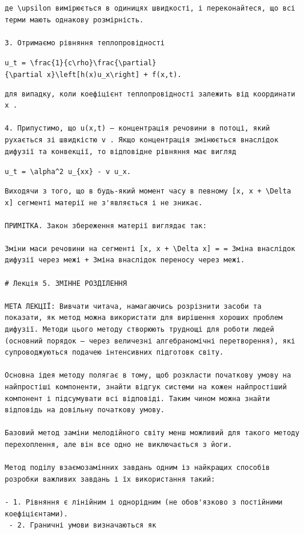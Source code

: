 \documentclass[
  ukrainian,
]{article}
\begin{document}
\begin{verbatim}
де \upsilon вимірюється в одиницях швидкості, і переконайтеся, що всі терми мають однакову розмірність.

3. Отримаємо рівняння теплопровідності
\end{verbatim}

\texttt{u\_t\ =\ \textbackslash{}frac\{1\}\{c\textbackslash{}rho\}\textbackslash{}frac\{\textbackslash{}partial\}\{\textbackslash{}partial\ x\}\textbackslash{}left{[}h(x)u\_x\textbackslash{}right{]}\ +\ f(x,t).}

\begin{verbatim}
для випадку, коли коефіцієнт теплопровідності залежить від координати x .

4. Припустимо, що u(x,t) — концентрація речовини в потоці, який рухається зі швидкістю v . Якщо концентрація змінюється внаслідок дифузії та конвекції, то відповідне рівняння має вигляд
\end{verbatim}

\texttt{u\_t\ =\ \textbackslash{}alpha\^{}2\ u\_\{xx\}\ -\ v\ u\_x.}

\begin{verbatim}
Виходячи з того, що в будь-який момент часу в певному [x, x + \Delta x] сегменті матерії не з'являється і не зникає.

ПРИМІТКА. Закон збереження матерії виглядає так:

Зміни маси речовини на сегменті [x, x + \Delta x] = = Зміна внаслідок дифузії через межі + Зміна внаслідок переносу через межі.

# Лекція 5. ЗМІННЕ РОЗДІЛЕННЯ

МЕТА ЛЕКЦІЇ: Вивчати читача, намагаючись розрізнити засоби та показати, як метод можна використати для вирішення хороших проблем дифузії. Методи цього методу створюють труднощі для роботи людей (основний порядок — через величезні алгебраномічні перетворення), які супроводжуються подачею інтенсивних підготовк світу.

Основна ідея методу полягає в тому, щоб розкласти початкову умову на найпростіші компоненти, знайти відгук системи на кожен найпростіший компонент і підсумувати всі відповіді. Таким чином можна знайти відповідь на довільну початкову умову.

Базовий метод заміни мелодійного світу менш можливий для такого методу перехоплення, але він все одно не виключається з йоги.

Метод поділу взаємозамінних завдань одним із найкращих способів розробки важливих завдань і їх використання такий:

- 1. Рівняння є лінійним і однорідним (не обов'язково з постійними коефіцієнтами).
 - 2. Граничні умови визначаються як
\end{verbatim}
\end{document}
